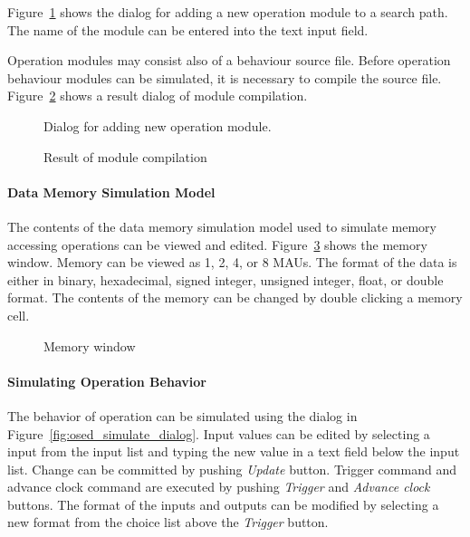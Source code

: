 \documentclass[twoside]{tceusermanual}
\begin{document}
Figure~\ref{fig:osed_add_module_dialog} shows the dialog for adding a new
operation module to a search path. The name of the module can be entered
into the text input field.  

Operation modules may consist also of a behaviour source file. Before
operation behaviour modules can be simulated, it is necessary to compile the
source file.  Figure~\ref{fig:osed_build_result_dialog} shows a result dialog of
module compilation. 

%
\begin{figure}[tb]
\centerline{}
\caption{Dialog for adding new operation module.}
\label{fig:osed_add_module_dialog}
\end{figure}
%
\begin{figure}[tb]
\centerline{}
\caption{Result of module compilation}
\label{fig:osed_build_result_dialog}
\end{figure}

\paragraph{Data Memory Simulation Model}

The contents of the data memory simulation model used to simulate
memory accessing operations can be viewed and edited.
Figure~\ref{fig:osed_memory_dialog}
shows the memory window. Memory can be viewed as 1, 2, 4, or 8 MAUs.
The format of the data is either in binary, hexadecimal, signed integer,
unsigned integer, float, or double format.
The contents of the memory can be changed by double clicking a memory cell. 

\begin{figure}[tb]
\centerline{}
\caption{Memory window}
\label{fig:osed_memory_dialog}
\end{figure}

\paragraph{Simulating Operation Behavior}

The behavior of operation can be simulated using the dialog in 
Figure~\ref{fig:osed_simulate_dialog}. Input values can be edited by selecting
a input from the input list and typing the new value in a text field below
the input list. Change can be committed by pushing \emph{Update} button.
Trigger command and advance clock command are executed 
by pushing \emph{Trigger} and \emph{Advance clock} buttons.
The format of the inputs and outputs can be modified by selecting a new format
from the choice list above the \emph{Trigger} button.
\end{document}
